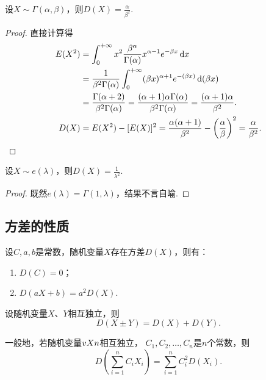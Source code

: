 \begin{theorem}
设\(X \sim \Gamma(\alpha,\beta)\)，则\(D(X) = \frac{\alpha}{\beta^2}\).
\begin{proof}
\def\inti{\int_0^{+\infty}}%
直接计算得
\begin{align*}
E(X^2) &= \int_0^{+\infty} x^2 \frac{\beta^{\alpha}}{\Gamma(\alpha)} x^{\alpha-1} e^{-\beta x} \dd{x} \\
&= \frac{1}{\beta^2 \Gamma(\alpha)} \int_0^{+\infty} (\beta x)^{\alpha+1} e^{-(\beta x)} \dd(\beta x) \\
&= \frac{\Gamma(\alpha+2)}{\beta^2 \Gamma(\alpha)}
= \frac{(\alpha+1) \alpha \Gamma(\alpha)}{\beta^2 \Gamma(\alpha)}
= \frac{(\alpha+1) \alpha}{\beta^2}. \\
D(X) &= E(X^2) - [E(X)]^2
= \frac{\alpha (\alpha+1)}{\beta^2} - \left( \frac{\alpha}{\beta} \right)^2
= \frac{\alpha}{\beta^2}.
\qedhere
\end{align*}
\end{proof}
\end{theorem}

\begin{theorem}
设\(X \sim e(\lambda)\)，则\(D(X) = \frac{1}{\lambda^2}\).
\begin{proof}
既然\(e(\lambda) = \Gamma(1,\lambda)\)，结果不言自喻.
\end{proof}
\end{theorem}

\subsection{方差的性质}
\begin{property}\label{theorem:随机变量的数字特征.方差的性质1}
设\(C,a,b\)是常数，随机变量\(X\)存在方差\(D(X)\)，则有：
\begin{enumerate}
\item \(D(C) = 0\)；
\item \(D(aX+b) = a^2 D(X)\).
\end{enumerate}
\end{property}

\begin{property}\label{theorem:随机变量的数字特征.方差的性质2}
设随机变量\(X\)、\(Y\)相互独立，则\[
D(X \pm Y) = D(X) + D(Y).
\]

一般地，若随机变量\(v{X}{n}\)相互独立，%
\(C_1,C_2,\dotsc,C_n\)是\(n\)个常数，则\[
D\left( \sum_{i=1}^n{C_i X_i} \right)
= \sum_{i=1}^n{C_i^2 D(X_i)}.
\]
\end{property}


